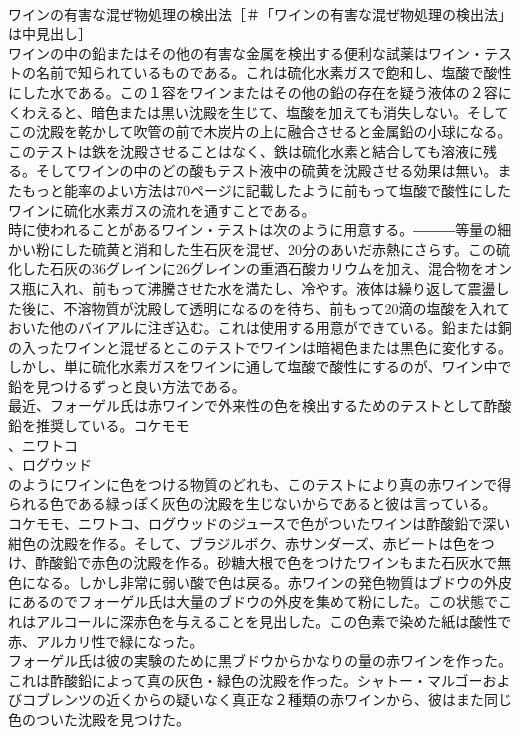 \documentclass[8pt]{extreport}
\begin{document}
\begin{CJK}{UTF8}{min}
\\	ワインの有害な混ぜ物処理の検出法［＃「ワインの有害な混ぜ物処理の検出法」は中見出し］
\\	ワインの中の鉛またはその他の有害な金属を検出する便利な試薬はワイン・テストの名前で知られているものである。これは硫化水素ガスで飽和し、塩酸で酸性にした水である。この１容をワインまたはその他の鉛の存在を疑う液体の２容にくわえると、暗色または黒い沈殿を生じて、塩酸を加えても消失しない。そしてこの沈殿を乾かして吹管の前で木炭片の上に融合させると金属鉛の小球になる。このテストは鉄を沈殿させることはなく、鉄は硫化水素と結合しても溶液に残る。そしてワインの中のどの酸もテスト液中の硫黄を沈殿させる効果は無い。またもっと能率のよい方法は70ページに記載したように前もって塩酸で酸性にしたワインに硫化水素ガスの流れを通すことである。
\\	時に使われることがあるワイン・テストは次のように用意する。―――等量の細かい粉にした硫黄と消和した生石灰を混ぜ、20分のあいだ赤熱にさらす。この硫化した石灰の36グレインに26グレインの重酒石酸カリウムを加え、混合物をオンス瓶に入れ、前もって沸騰させた水を満たし、冷やす。液体は繰り返して震盪した後に、不溶物質が沈殿して透明になるのを待ち、前もって20滴の塩酸を入れておいた他のバイアルに注ぎ込む。これは使用する用意ができている。鉛または銅の入ったワインと混ぜるとこのテストでワインは暗褐色または黒色に変化する。しかし、単に硫化水素ガスをワインに通して塩酸で酸性にするのが、ワイン中で鉛を見つけるずっと良い方法である。
\\	最近、フォーゲル氏は赤ワインで外来性の色を検出するためのテストとして酢酸鉛を推奨している。コケモモ
\\	、ニワトコ
\\	、ログウッド
\\	のようにワインに色をつける物質のどれも、このテストにより真の赤ワインで得られる色である緑っぽく灰色の沈殿を生じないからであると彼は言っている。
\\	コケモモ、ニワトコ、ログウッドのジュースで色がついたワインは酢酸鉛で深い紺色の沈殿を作る。そして、ブラジルボク、赤サンダーズ、赤ビートは色をつけ、酢酸鉛で赤色の沈殿を作る。砂糖大根で色をつけたワインもまた石灰水で無色になる。しかし非常に弱い酸で色は戻る。赤ワインの発色物質はブドウの外皮にあるのでフォーゲル氏は大量のブドウの外皮を集めて粉にした。この状態でこれはアルコールに深赤色を与えることを見出した。この色素で染めた紙は酸性で赤、アルカリ性で緑になった。
\\	フォーゲル氏は彼の実験のために黒ブドウからかなりの量の赤ワインを作った。これは酢酸鉛によって真の灰色・緑色の沈殿を作った。シャトー・マルゴーおよびコブレンツの近くからの疑いなく真正な２種類の赤ワインから、彼はまた同じ色のついた沈殿を見つけた。

\end{CJK}
\end{document}
